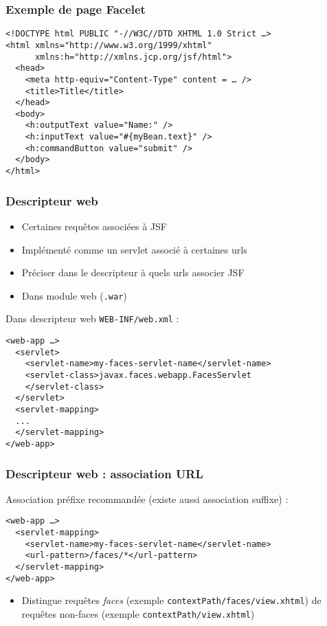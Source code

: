 \documentclass[english, french]{beamer}
\begin{document}
\begin{frame}[fragile]
	\frametitle{Exemple de page Facelet}
	\begin{lstlisting}
<!DOCTYPE html PUBLIC "-//W3C//DTD XHTML 1.0 Strict …>
<html xmlns="http://www.w3.org/1999/xhtml"
      xmlns:h="http://xmlns.jcp.org/jsf/html">
  <head>
    <meta http-equiv="Content-Type" content = … />
    <title>Title</title>
  </head>
  <body>
    <h:outputText value="Name:" />
    <h:inputText value="#{myBean.text}" />
    <h:commandButton value="submit" />
  </body>
</html>
	\end{lstlisting}
\end{frame}
	
\begin{frame}[fragile]
	\frametitle{Descripteur web}
	\begin{itemize}
		\item Certaines requêtes associées à JSF
		\item Implémenté comme un servlet associé à certaines urls
		\item Préciser dans le descripteur à quels urls associer JSF
		\item Dans module web (\texttt{.war})
	\end{itemize}
	Dans descripteur web \texttt{WEB-INF/web.xml} :
	\begin{lstlisting}[aboveskip=0.2em, belowskip=0em]
<web-app …>
  <servlet>
    <servlet-name>my-faces-servlet-name</servlet-name>
    <servlet-class>javax.faces.webapp.FacesServlet
    </servlet-class>
  </servlet>
  <servlet-mapping>
  ...
  </servlet-mapping>
</web-app>
	\end{lstlisting}
\end{frame}

\begin{frame}[fragile]
	\frametitle{Descripteur web : association URL}
	Association préfixe recommandée {\tiny (existe aussi association suffixe)} :
	\begin{lstlisting}[aboveskip=1em, belowskip=1em]
<web-app …>
  <servlet-mapping>
    <servlet-name>my-faces-servlet-name</servlet-name>
    <url-pattern>/faces/*</url-pattern>
  </servlet-mapping>
</web-app>
	\end{lstlisting}
	\begin{itemize}
		\item Distingue requêtes \emph{faces} (exemple \texttt{contextPath/faces/view.xhtml}) de requêtes non-faces (exemple \texttt{contextPath/view.xhtml})
	\end{itemize}
\end{frame}
\end{document}
